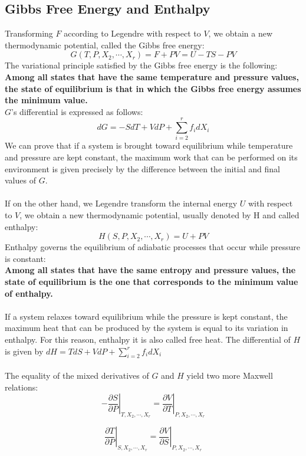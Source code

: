 \subsection{Gibbs Free Energy and Enthalpy}
Transforming $F$ according to Legendre with respect to $V$, we obtain a new thermodynamic potential, called the Gibbs free energy:
\[G(T,P,X_2,\cdots,X_r) = F + PV = U - TS - PV\]
The variational principle satisfied by the Gibbs free
energy is the following:
\\
\textbf{Among all states that have the same temperature and pressure values, the state of equilibrium is that in which the Gibbs free energy assumes the minimum value.}
\\
$G$'s differential is expressed as follows:
\[dG = -SdT + VdP + \sum_{i=2}^r f_i dX_i \]
We can prove that if a system is brought toward equilibrium while temperature and pressure are kept constant, the maximum work that can be performed on its environment is given precisely by the difference between the initial and final values of $G$.
\\ \\
If on the other hand, we Legendre transform the internal energy $U$ with respect to $V$, we obtain a new thermodynamic potential, usually denoted by H and called enthalpy:
\[H(S,P,X_2,\cdots,X_r) = U + PV\]
Enthalpy governs the equilibrium of adiabatic processes that occur while pressure is constant:
\\
\textbf{Among all states that have the same entropy and pressure values, the state of equilibrium is the one that corresponds to the minimum value of enthalpy.}
\\ \\
If a system relaxes toward equilibrium while the pressure is kept constant, the maximum heat that can be produced by the system is equal to its variation in enthalpy. For this reason, enthalpy it is also called free heat.
The differential of $H$ is given by
$dH = TdS + VdP + \sum_{i=2}^r f_i dX_i$
\\ \\
The equality of the mixed derivatives of $G$ and $H$ yield two more Maxwell relations:
\[\left. -\frac{\partial S}{\partial P} \right|_{T,X_2,\cdots,X_r} = \left. \frac{\partial V}{\partial T} \right|_{P,X_2,\cdots,X_r}\]

\[\left. \frac{\partial T}{\partial P} \right|_{S,X_2,\cdots,X_r} = \left. \frac{\partial V}{\partial S} \right|_{P,X_2,\cdots,X_r}\]

